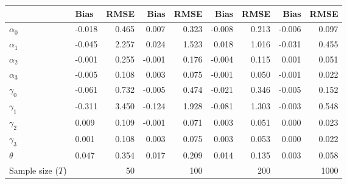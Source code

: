 
\begin{tabular}[t]{llrrrrrrr}
\toprule
  & Bias & RMSE & Bias & RMSE & Bias & RMSE & Bias & RMSE\\
\midrule
$\alpha_{0}$ & -0.018 & 0.465 & 0.007 & 0.323 & -0.008 & 0.213 & -0.006 & 0.097\\
$\alpha_{1}$ & -0.045 & 2.257 & 0.024 & 1.523 & 0.018 & 1.016 & -0.031 & 0.455\\
$\alpha_{2}$ & -0.001 & 0.255 & -0.001 & 0.176 & -0.004 & 0.115 & 0.001 & 0.051\\
$\alpha_{3}$ & -0.005 & 0.108 & 0.003 & 0.075 & -0.001 & 0.050 & -0.001 & 0.022\\
$\gamma_{0}$ & -0.061 & 0.732 & -0.005 & 0.474 & -0.021 & 0.346 & -0.005 & 0.152\\
$\gamma_{1}$ & -0.311 & 3.450 & -0.124 & 1.928 & -0.081 & 1.303 & -0.003 & 0.548\\
$\gamma_{2}$ & 0.009 & 0.109 & -0.001 & 0.071 & 0.003 & 0.051 & 0.000 & 0.023\\
$\gamma_{3}$ & 0.001 & 0.108 & 0.003 & 0.075 & 0.003 & 0.053 & 0.000 & 0.022\\
$\theta$ & 0.047 & 0.354 & 0.017 & 0.209 & 0.014 & 0.135 & 0.003 & 0.058\\
Sample size ($T$) &  & 50 &  & 100 &  & 200 &  & 1000\\
\bottomrule
\end{tabular}
